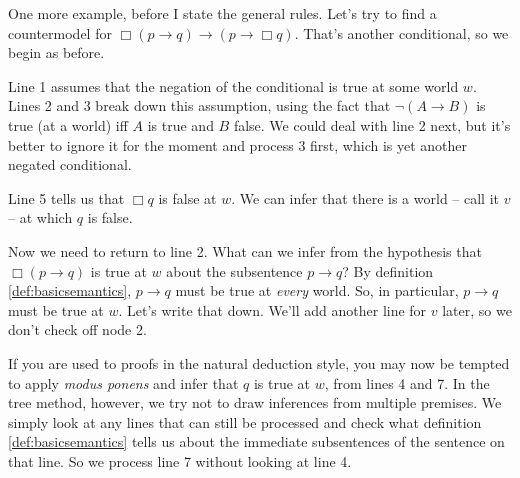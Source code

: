 One more example, before I state the general rules. Let's try to find a
countermodel for $\Box(p\to q) \to (p \to \Box q)$. That's another conditional,
so we begin as before.
\begin{center}
\end{center}
%
Line 1 assumes that the negation of the conditional is true at some world $w$.
Lines 2 and 3 break down this assumption, using the fact that $\neg (A \to B)$
is true (at a world) iff $A$ is true and $B$ false. We could deal with line 2
next, but it's better to ignore it for the moment and process 3 first, which is
yet another negated conditional.

\begin{center}
\end{center}

Line 5 tells us that $\Box q$ is false at $w$. We can infer that there is a
world -- call it $v$ -- at which $q$ is false.

\begin{center}
\end{center}

Now we need to return to line 2. What can we infer from the hypothesis that
$\Box(p\to q)$ is true at $w$ about the subsentence $p \to q$? By definition
\ref{def:basicsemantics}, $p \to q$ must be true at \emph{every} world. So, in
particular, $p\to q$ must be true at $w$. Let's write that down. We'll add
another line for $v$ later, so we don't check off node 2.

\begin{center}
\end{center}

If you are used to proofs in the natural deduction style, you may now be tempted
to apply \emph{modus ponens} and infer that $q$ is true at $w$, from lines 4 and
7. In the tree method, however, we try not to draw inferences from multiple
premises. We simply look at any lines that can still be processed and check what
definition \ref{def:basicsemantics} tells us about the immediate subsentences of
the sentence on that line. So we process line 7 without looking at line 4.

